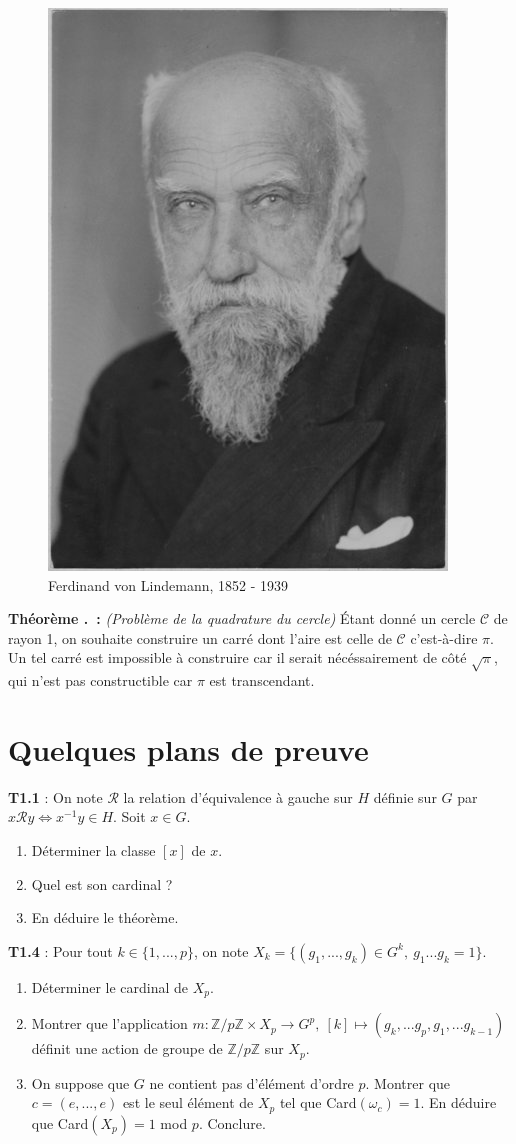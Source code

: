 \documentclass[5pt,a4paper]{article}
\newcounter{thmcounter}[subsection]
\renewcommand{\thethmcounter}{\thesubsection.\arabic{thmcounter}}
\newcommand{\thm}[1]{
    \stepcounter{thmcounter}
    \hypertarget{t:\thethmcounter}{}%
    \noindent\textbf{Théorème \thethmcounter ~:} #1 \newline
}
\begin{document}
\begin{onehalfspacing}
\begin{figure}[!h]
\centering
\includegraphics[width = 0.33\linewidth]{ressources/lindemann.jpg}
\caption{Ferdinand von Lindemann, 1852 - 1939}
\end{figure}

\thm{\textit{(Problème de la quadrature du cercle)} Étant donné un cercle $\mathcal{C}$ de rayon 1, on souhaite construire un carré dont l'aire est celle de $\mathcal{C}$ c'est-à-dire $\pi$. Un tel carré est impossible à construire car il serait nécéssairement de côté $\sqrt{\pi}$, qui n'est pas constructible car $\pi$ est transcendant.}

\newpage
\section{Quelques plans de preuve}

\textbf{T1.1} : On note $\mathcal{R}$ la relation d'équivalence à gauche sur $H$ définie sur $G$ par $x\mathcal{R}y \Leftrightarrow x^{-1}y \in H$. Soit $x \in G$.
\begin{enumerate}
	\item Déterminer la classe $[x]$ de $x$.
	\item Quel est son cardinal ?
	\item En déduire le théorème.
\end{enumerate}

\textbf{T1.4} : Pour tout $k \in \{1, ..., p\}$, on note $X_k = \{(g_1, ..., g_k)\in G^k,~g_1...g_k = 1\}$.
\begin{enumerate}
	\item Déterminer le cardinal de $X_p$.
	\item Montrer que l'application $m : \mathbb{Z}/p\mathbb{Z} \times X_p \rightarrow G^p,~[k] \mapsto (g_k,...g_p,g_1,...g_{k-1})$ définit une action de groupe de $\mathbb{Z}/p\mathbb{Z}$ sur $X_p$.
	\item On suppose que $G$ ne contient pas d'élément d'ordre $p$. Montrer que  $c = (e, ..., e)$ est le seul élément de $X_p$ tel que Card$(\omega_c) = 1$. En déduire que Card$(X_p) = 1$ mod $p$. Conclure.
\end{enumerate}


\end{onehalfspacing}
\end{document}
